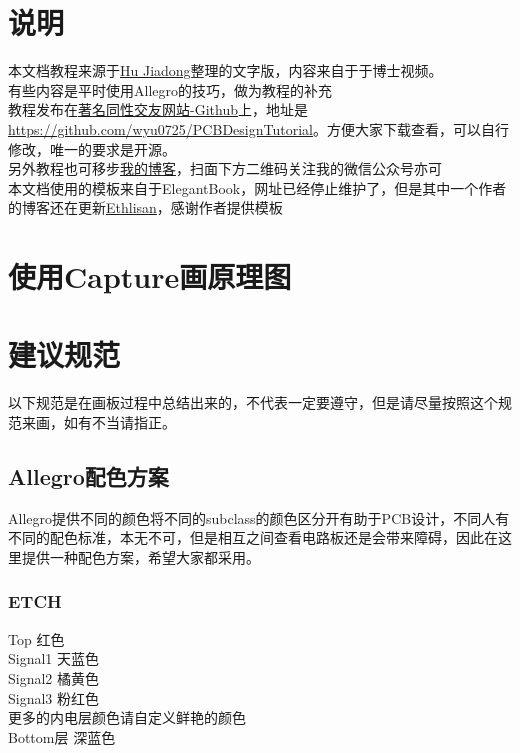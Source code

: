 \documentclass[color=green,mathpazo,titlestyle=hang,11pt]{elegantbook}
\author{Wang Yu}
\begin{document}
\maketitle
\tableofcontents
\mainmatter
\chapter*{说明}
本文档教程来源于\href{mailto:hdjemail@mail.ustc.edu.cn}{Hu Jiadong}整理的文字版，内容来自于于博士视频。\\
有些内容是平时使用Allegro的技巧，做为教程的补充\\
教程发布在\href{https://zh.wikipedia.org/wiki/Wikipedia:%E5%9D%8F%E7%AC%91%E8%AF%9D%E5%92%8C%E5%88%A0%E9%99%A4%E7%9A%84%E8%83%A1%E8%AF%9D/GitHub}{著名同性交友网站-Github}上，地址是\href{https://github.com/wyu0725/PCBDesignTutorial}{https://github.com/wyu0725/PCBDesignTutorial}。方便大家下载查看，可以自行修改，唯一的要求是开源。\\
另外教程也可移步\href{https://wyu0725.github.io}{我的博客}，扫面下方二维码关注我的微信公众号亦可\\
本文档使用的模板来自于ElegantBook，网址已经停止维护了，但是其中一个作者的博客还在更新\href{http://ddswhu.com/}{Ethlisan}，感谢作者提供模板

\chapter{使用Capture画原理图}
\chapter{建议规范}
以下规范是在画板过程中总结出来的，不代表一定要遵守，但是请尽量按照这个规范来画，如有不当请指正。
\section{Allegro配色方案}
Allegro提供不同的颜色将不同的subclass的颜色区分开有助于PCB设计，不同人有不同的配色标准，本无不可，但是相互之间查看电路板还是会带来障碍，因此在这里提供一种配色方案，希望大家都采用。\\
\subsection{ETCH}
\begin{center}
\textcolor[rgb]{1,0,0}{Top 红色}\\
\textcolor[rgb]{0.13,0.8,0.94}{Signal1 天蓝色}\\
\textcolor[rgb]{1,0.5,0}{Signal2 橘黄色}\\
\textcolor[rgb]{1,0,1}{Signal3 粉红色}\\
更多的内电层颜色请自定义鲜艳的颜色\\
\textcolor[rgb]{0,0,1}{Bottom层 深蓝色}\\
\end{center}
\end{document}
